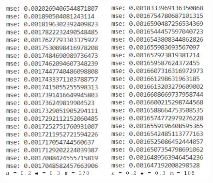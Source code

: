 \documentclass{beamer}
\begin{document}
\begin{frame}
    \begin{columns}
    
    \begin{figure}
        \centering
        \includegraphics[scale=0.5]{presentation/poredjenje mse.png}
    \end{figure}
    

\end{columns}
\end{frame}
\end{document}
